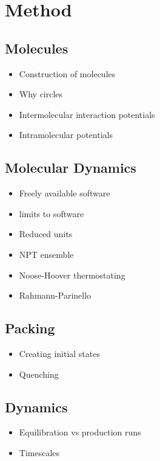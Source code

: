 
\chapter{Method}

\section{Molecules}

\begin{itemize}
    \item Construction of molecules
    \item Why circles
    \item Intermolecular interaction potentials
    \item Intramolecular potentials
\end{itemize}

\section{Molecular Dynamics}

\begin{itemize}
    \item Freely available software
    \item limits to software
    \item Reduced units
    \item NPT ensemble
    \item Noose-Hoover thermostating
    \item Rahmann-Parinello
\end{itemize}

\section{Packing}

\begin{itemize}
    \item Creating initial states
    \item Quenching
\end{itemize}

\section{Dynamics}

\begin{itemize}
    \item Equilibration vs production runs
    \item Timescales
\end{itemize}


